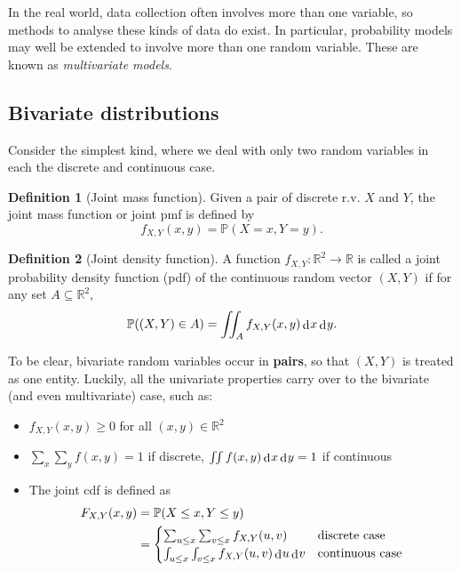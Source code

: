 \documentclass[
]{book}
\providecommand{\tightlist}{%
  \setlength{\itemsep}{0pt}\setlength{\parskip}{0pt}}
\newcommand{\bbR}{\mathbb{R}}
\newcommand{\bbP}{\mathbb{P}}
\DeclareMathOperator{\dd}{d}
\newcommand{\dint}{\dd\hspace{0.5pt}\!}
\theoremstyle{definition}
\newtheorem{definition}{Definition}[chapter]
\theoremstyle{definition}
\theoremstyle{definition}
\theoremstyle{definition}
\theoremstyle{remark}
\begin{document}
In the real world, data collection often involves more than one variable, so methods to analyse these kinds of data do exist.
In particular, probability models may well be extended to involve more than one random variable.
These are known as \emph{multivariate models}.

\hypertarget{bivariate-distributions}{%
\subsection{Bivariate distributions}\label{bivariate-distributions}}

Consider the simplest kind, where we deal with only two random variables in each the discrete and continuous case.

\begin{definition}[Joint mass function]
Given a pair of discrete r.v. \(X\) and \(Y\), the joint mass function or joint pmf is defined by
\[
f_{X,Y}(x,y) = \bbP(X=x,Y=y).
\]
\end{definition}

\begin{definition}[Joint density function]
A function \(f_{X,Y}:\bbR^2\to\bbR\) is called a joint probability density function (pdf) of the continuous random vector \((X,Y)\) if for any set \(A\subseteq\bbR^2\),
\[
  \bbP((X,Y) \in A) = \iint_{A} f_{X,Y}(x,y)\dint x \dint y.
\]
\end{definition}

To be clear, bivariate random variables occur in \textbf{pairs}, so that \((X,Y)\) is treated as one entity.
Luckily, all the univariate properties carry over to the bivariate (and even multivariate) case, such as:

\begin{itemize}
\tightlist
\item
  \(f_{X,Y}(x,y) \geq 0\) for all \((x,y) \in \bbR^2\)
\item
  \(\sum_x\sum_y f(x,y) = 1\) if discrete, \(\iint f(x,y)\dint x \dint y = 1\) if continuous
\item
  The joint cdf is defined as
  \begin{align*}
  F_{X,Y}(x,y) &=  \bbP(X\leq x, Y\leq y) \\
  &= \begin{cases}
  \sum_{u\leq x}\sum_{v\leq x} f_{X,Y}(u,v) &\text{discrete case} \\
  \int_{u\leq x}\int_{v\leq x} f_{X,Y}(u,v) \dint u \dint v &\text{continuous case} \\
  \end{cases}
  \end{align*}
\end{itemize}
\end{document}
